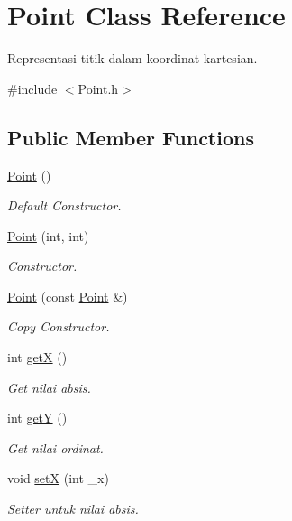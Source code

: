 \hypertarget{class_point}{}\section{Point Class Reference}
\label{class_point}


Representasi titik dalam koordinat kartesian.  




{\ttfamily \#include $<$Point.\+h$>$}

\subsection*{Public Member Functions}
\begin{DoxyCompactItemize}
\item 
\hyperlink{class_point_ad92f2337b839a94ce97dcdb439b4325a}{Point} ()
\begin{DoxyCompactList}\small\item\em Default Constructor. \end{DoxyCompactList}\item 
\hyperlink{class_point_a7e2f39fba71990705aac9ffee1b389b4}{Point} (int, int)
\begin{DoxyCompactList}\small\item\em Constructor. \end{DoxyCompactList}\item 
\hyperlink{class_point_a5b7ec0fb127734c1cd5c6f350a3990fc}{Point} (const \hyperlink{class_point}{Point} \&)
\begin{DoxyCompactList}\small\item\em Copy Constructor. \end{DoxyCompactList}\item 
int \hyperlink{class_point_a0b82a4aa9614c11854abc507d89a70a9}{getX} ()
\begin{DoxyCompactList}\small\item\em Get nilai absis. \end{DoxyCompactList}\item 
int \hyperlink{class_point_a3770f321c49dfe7ca463900fddc2e2bc}{getY} ()
\begin{DoxyCompactList}\small\item\em Get nilai ordinat. \end{DoxyCompactList}\item 
void \hyperlink{class_point_aa1d444024813ee4def15bb8576c351fc}{setX} (int \+\_\+x)
\begin{DoxyCompactList}\small\item\em Setter untuk nilai absis. \end{DoxyCompactList}\item 

\end{DoxyCompactItemize}
